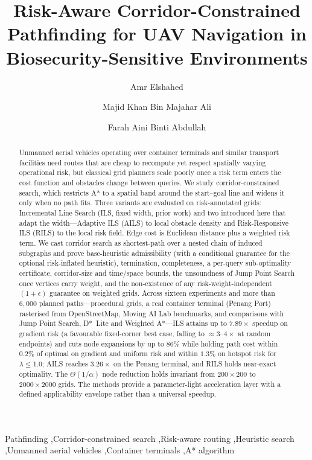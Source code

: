 \documentclass[preprint,12pt,authoryear]{elsarticle}
\begin{document}
\begin{frontmatter}

\title{Risk-Aware Corridor-Constrained Pathfinding for UAV Navigation in Biosecurity-Sensitive Environments}

\author[usm]{Amr Elshahed}

\author[usm]{Majid Khan Bin Majahar Ali}
\author[usm]{Farah Aini Binti Abdullah}

\address[usm]{School of Computer Sciences, Universiti Sains Malaysia, 11800 Penang, Malaysia}


\begin{abstract}
Unmanned aerial vehicles operating over container terminals and similar transport facilities need routes that are cheap to recompute yet respect spatially varying operational risk, but classical grid planners scale poorly once a risk term enters the cost function and obstacles change between queries. We study corridor-constrained search, which restricts A* to a spatial band around the start--goal line and widens it only when no path fits. Three variants are evaluated on risk-annotated grids: Incremental Line Search (ILS, fixed width, prior work) and two introduced here that adapt the width---Adaptive ILS (AILS) to local obstacle density and Risk-Responsive ILS (RILS) to the local risk field. Edge cost is Euclidean distance plus a weighted risk term. We cast corridor search as shortest-path over a nested chain of induced subgraphs and prove base-heuristic admissibility (with a conditional guarantee for the optional risk-inflated heuristic), termination, completeness, a per-query sub-optimality certificate, corridor-size and time/space bounds, the unsoundness of Jump Point Search once vertices carry weight, and the non-existence of any risk-weight-independent $(1+\epsilon)$ guarantee on weighted grids. Across sixteen experiments and more than $6{,}000$ planned paths---procedural grids, a real container terminal (Penang Port) rasterised from OpenStreetMap, Moving AI Lab benchmarks, and comparisons with Jump Point Search, D*~Lite and Weighted A*---ILS attains up to $7.89\times$ speedup on gradient risk (a favourable fixed-corner best case, falling to $\approx 3$--$4\times$ at random endpoints) and cuts node expansions by up to $86\%$ while holding path cost within $0.2\%$ of optimal on gradient and uniform risk and within $1.3\%$ on hotspot risk for $\lambda \leq 1.0$; AILS reaches $3.26\times$ on the Penang terminal, and RILS holds near-exact optimality. The $\Theta(1/\alpha)$ node reduction holds invariant from $200\times200$ to $2000\times2000$ grids. The methods provide a parameter-light acceleration layer with a defined applicability envelope rather than a universal speedup.
\end{abstract}

\begin{keyword}
Pathfinding \sep Corridor-constrained search \sep Risk-aware routing \sep Heuristic search \sep Unmanned aerial vehicles \sep Container terminals \sep A* algorithm
\end{keyword}

\end{frontmatter}
\end{document}
